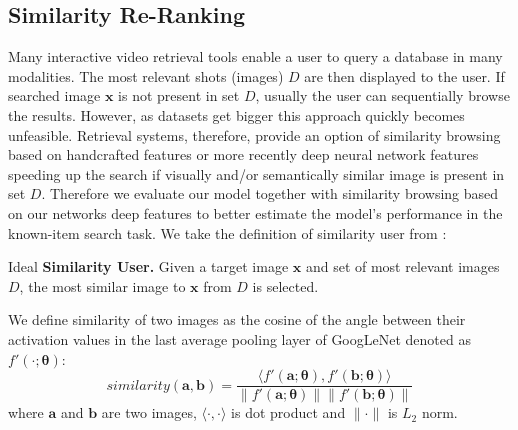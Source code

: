 \subsection{Similarity Re-Ranking}
Many interactive video retrieval tools enable a user to query a database in many modalities. The most relevant shots (images) $D$ are then displayed to the user. If searched image $\bm{x}$ is not present in set $D$, usually the user can sequentially browse the results. However, as datasets get bigger this approach quickly becomes unfeasible. Retrieval systems, therefore, provide an option of similarity browsing based on handcrafted features or more recently deep neural network features~\cite{lokovc2018revisiting, barthel2018fusing} speeding up the search if visually and/or semantically similar image is present in set $D$. Therefore we evaluate our model together with similarity browsing based on our networks deep features to better estimate the model's performance in the known-item search task. We take the definition of similarity user from \cite{kovalvcik2017comparison}:
\begin{description}[labelwidth=1em, leftmargin=!]
	\item Ideal \textbf{Similarity User.} Given a target image $\bm{x}$ and set of most relevant images $D$, the most similar image to $\bm{x}$ from $D$ is selected.
\end{description}
We define similarity of two images as the cosine of the angle between their activation values in the last average pooling layer of GoogLeNet denoted as $f'(\cdot;\bm{\theta})$:
\begin{equation}
similarity(\bm{a},\bm{b}) = \frac{\langle f'(\bm{a};\bm{\theta}),f'(\bm{b};\bm{\theta})\rangle}{\|f'(\bm{a};\bm{\theta})\|\|f'(\bm{b};\bm{\theta})\|}
\end{equation}
where $\bm{a}$ and $\bm{b}$ are two images, $\langle\cdot,\cdot\rangle$ is dot product and $\|\cdot\|$ is $L_2$ norm.

